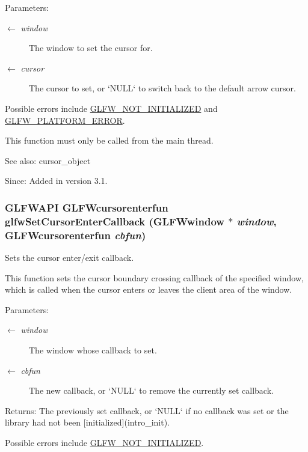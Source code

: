 \begin{Desc}
\item[Parameters:]
\begin{description}
\item[\mbox{$\leftarrow$} {\em window}]The window to set the cursor for. \item[\mbox{$\leftarrow$} {\em cursor}]The cursor to set, or `NULL` to switch back to the default arrow cursor.\end{description}
\end{Desc}
Possible errors include \hyperlink{group__errors_g2374ee02c177f12e1fa76ff3ed15e14a}{GLFW\_\-NOT\_\-INITIALIZED} and \hyperlink{group__errors_gd44162d78100ea5e87cdd38426b8c7a1}{GLFW\_\-PLATFORM\_\-ERROR}.

This function must only be called from the main thread.

\begin{Desc}
\item[See also:]cursor\_\-object\end{Desc}
\begin{Desc}
\item[Since:]Added in version 3.1. \end{Desc}
\hypertarget{group__input_ga20014985561efeb2c53f1956f727830}{
\subsubsection[glfwSetCursorEnterCallback]{\setlength{\rightskip}{0pt plus 5cm}GLFWAPI {\bf GLFWcursorenterfun} glfwSetCursorEnterCallback ({\bf GLFWwindow} $\ast$ {\em window}, \/  {\bf GLFWcursorenterfun} {\em cbfun})}}
\label{group__input_ga20014985561efeb2c53f1956f727830}


Sets the cursor enter/exit callback. 

This function sets the cursor boundary crossing callback of the specified window, which is called when the cursor enters or leaves the client area of the window.

\begin{Desc}
\item[Parameters:]
\begin{description}
\item[\mbox{$\leftarrow$} {\em window}]The window whose callback to set. \item[\mbox{$\leftarrow$} {\em cbfun}]The new callback, or `NULL` to remove the currently set callback. \end{description}
\end{Desc}
\begin{Desc}
\item[Returns:]The previously set callback, or `NULL` if no callback was set or the library had not been \mbox{[}initialized\mbox{]}(intro\_\-init).\end{Desc}
Possible errors include \hyperlink{group__errors_g2374ee02c177f12e1fa76ff3ed15e14a}{GLFW\_\-NOT\_\-INITIALIZED}.

